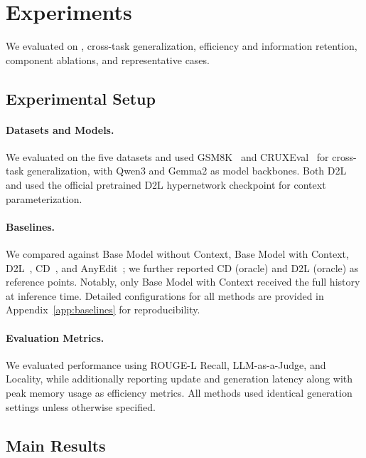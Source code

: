 \section{Experiments}
\label{sec:experiments}

We evaluated \method{} on \benchmark{}, cross-task generalization, efficiency and information retention, component ablations, and representative cases.

\subsection{Experimental Setup}
\label{sec:exp_setup}

\paragraph{Datasets and Models.}
We evaluated on the five \benchmark{} datasets and used GSM8K~\citep{cobbe2021training} and CRUXEval~\citep{gu2024cruxeval} for cross-task generalization, with Qwen3 and Gemma2 as model backbones.
Both D2L and \method{} used the official pretrained D2L hypernetwork checkpoint for context parameterization. 

\paragraph{Baselines.}
We compared against Base Model without Context, Base Model with Context, D2L~\citep{charakorn2026doc}, CD~\citep{snell2022learning}, and AnyEdit~\citep{jiang2025anyedit}; we further reported CD (oracle) and D2L (oracle) as reference points. 
Notably, only Base Model with Context received the full history at inference time. 
Detailed configurations for all methods are provided in Appendix~\ref{app:baselines} for reproducibility.

\paragraph{Evaluation Metrics.}
We evaluated performance using ROUGE-L Recall, LLM-as-a-Judge, and Locality, while additionally reporting update and generation latency along with peak memory usage as efficiency metrics. 
All methods used identical generation settings unless otherwise specified.

\subsection{Main Results}
\label{sec:main_results}

